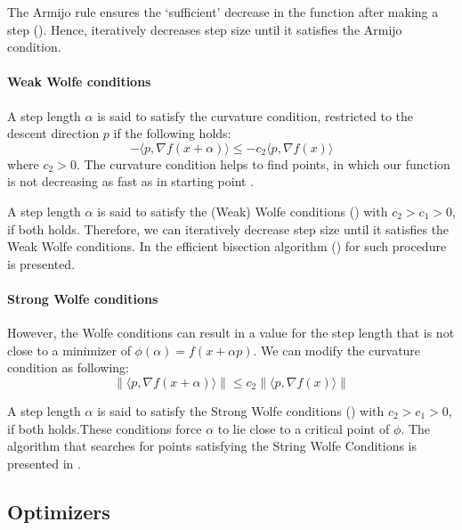 \documentclass{article}
\begin{document}
The Armijo rule ensures the `sufficient' decrease in the function after making a step ().
Hence,  iteratively decreases step size until it satisfies the Armijo condition.


\paragraph{Weak Wolfe conditions}
A step length $\alpha$ is said to satisfy the curvature condition, restricted to the descent direction $p$ if the following holds:
\begin{equation}\label{eq:curv}
  - \langle p, \nabla f(x + \alpha) \rangle \leq -c_2 \langle p, \nabla f(x) \rangle
\end{equation}
where $c_2 > 0$.
The curvature condition helps to find points, in which our function is not decreasing as fast as in starting point .



A step length $\alpha$ is said to satisfy the (Weak) Wolfe conditions () with $c_2 > c_1 > 0$, if both  holds. Therefore, we can iteratively decrease step size until it satisfies the Weak Wolfe conditions. In \cite{evgrafov} the efficient bisection algorithm () for such procedure is presented.


\paragraph{Strong Wolfe conditions}
However, the Wolfe conditions can result in a value for the step length that is not close to a minimizer of $\phi(\alpha) = f(x + \alpha p)$. We can modify the curvature condition as following:
\begin{equation}\label{eq:curv_strong}
  \| \langle p, \nabla f(x + \alpha) \rangle \| \leq c_2 \| \langle p, \nabla f(x) \rangle \|
\end{equation}

A step length $\alpha$ is said to satisfy the Strong Wolfe conditions () with $c_2 > c_1 > 0$, if both  holds.These conditions force $\alpha$ to lie close to a critical point of $\phi$. The algorithm that searches for points satisfying the String Wolfe Conditions is presented in .

\subsection{Optimizers}
\end{document}
